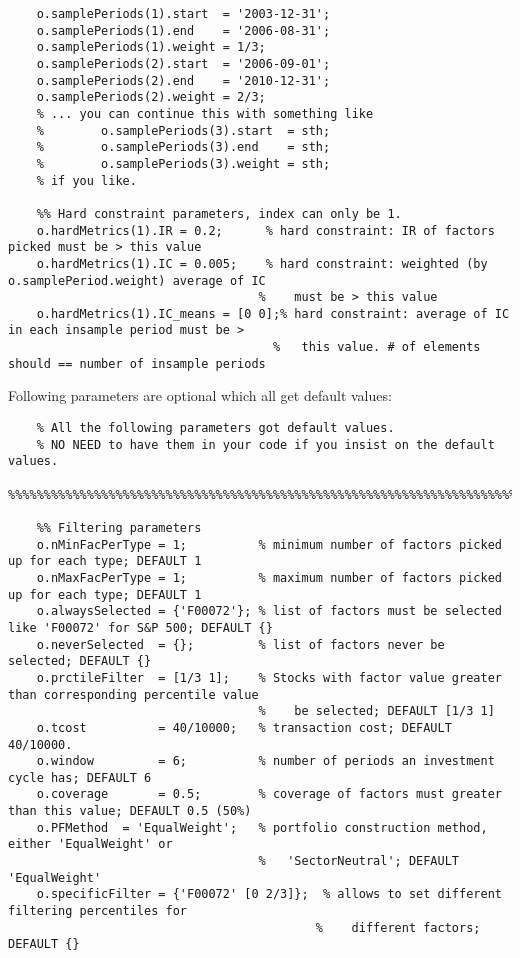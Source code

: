 \documentclass[10pt,oneside,a4paper]{article}
\begin{document}
\begin{enumerate}
\begin{lstlisting}[firstnumber=last]
	%% In-sample periods
	o.samplePeriods(1).start  = '2003-12-31';
	o.samplePeriods(1).end    = '2006-08-31';
	o.samplePeriods(1).weight = 1/3;
	o.samplePeriods(2).start  = '2006-09-01';
	o.samplePeriods(2).end    = '2010-12-31';
	o.samplePeriods(2).weight = 2/3;
	% ... you can continue this with something like
	%        o.samplePeriods(3).start  = sth;
	%        o.samplePeriods(3).end    = sth;
	%        o.samplePeriods(3).weight = sth;
	% if you like.
	
	%% Hard constraint parameters, index can only be 1.
	o.hardMetrics(1).IR = 0.2;      % hard constraint: IR of factors picked must be > this value
	o.hardMetrics(1).IC = 0.005;    % hard constraint: weighted (by o.samplePeriod.weight) average of IC
                                   %    must be > this value
	o.hardMetrics(1).IC_means = [0 0];% hard constraint: average of IC in each insample period must be > 
                                     %   this value. # of elements should == number of insample periods
\end{lstlisting}

   Following parameters are optional which all get default values:

\begin{lstlisting}[firstnumber=last]
	%%%%%%%%%%%%%%%%%%%%%%%%%%%%%%%%%%%%%%%%%%%%%%%%%%%%%%%%%%%%%%%%%%%%%%%%%%%%
	% All the following parameters got default values. 
	% NO NEED to have them in your code if you insist on the default values.
	%%%%%%%%%%%%%%%%%%%%%%%%%%%%%%%%%%%%%%%%%%%%%%%%%%%%%%%%%%%%%%%%%%%%%%%%%%%%
	
	%% Filtering parameters
	o.nMinFacPerType = 1;          % minimum number of factors picked up for each type; DEFAULT 1
	o.nMaxFacPerType = 1;          % maximum number of factors picked up for each type; DEFAULT 1
	o.alwaysSelected = {'F00072'}; % list of factors must be selected like 'F00072' for S&P 500; DEFAULT {}
	o.neverSelected  = {};         % list of factors never be selected; DEFAULT {}
	o.prctileFilter  = [1/3 1];    % Stocks with factor value greater than corresponding percentile value
	                               %    be selected; DEFAULT [1/3 1]
	o.tcost          = 40/10000;   % transaction cost; DEFAULT 40/10000.
	o.window         = 6;          % number of periods an investment cycle has; DEFAULT 6
	o.coverage       = 0.5;        % coverage of factors must greater than this value; DEFAULT 0.5 (50%)
	o.PFMethod  = 'EqualWeight';   % portfolio construction method, either 'EqualWeight' or 
	                               %   'SectorNeutral'; DEFAULT 'EqualWeight'
	o.specificFilter = {'F00072' [0 2/3]};  % allows to set different filtering percentiles for 
                                           %    different factors; DEFAULT {}
	

\end{lstlisting}
\end{enumerate}
\end{document}
